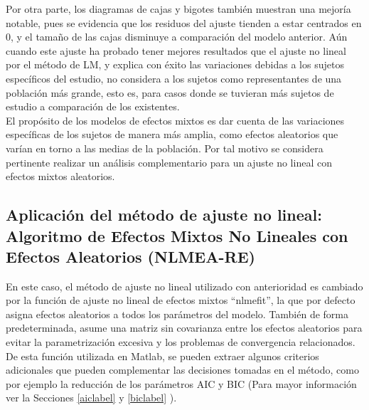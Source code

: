 Por otra parte, los diagramas de cajas y bigotes también muestran una mejoría notable, pues se evidencia que los residuos del ajuste tienden a estar centrados en 0, y el tamaño de las cajas disminuye a comparación del modelo anterior. Aún cuando este ajuste ha probado tener mejores resultados que el ajuste no lineal por el método de LM, y explica con éxito las variaciones debidas a los sujetos específicos del estudio, no considera a los sujetos como representantes de una población más grande, esto es, para casos donde se tuvieran más sujetos de estudio a comparación de los existentes.\\

El propósito de los modelos de efectos mixtos es dar cuenta de las variaciones específicas de los sujetos de manera más amplia, como efectos aleatorios que varían en torno a las medias de la población. Por tal motivo se considera pertinente realizar un análisis complementario para un ajuste no lineal con efectos mixtos aleatorios. %

\subsection{Aplicación del método de ajuste no lineal: Algoritmo de Efectos Mixtos No Lineales con Efectos Aleatorios (NLMEA-RE)}

En este caso, el método de ajuste no lineal utilizado con anterioridad es cambiado por la función de ajuste no lineal de efectos mixtos ``nlmefit'', la que por defecto  asigna efectos aleatorios a todos los parámetros del modelo. También de forma predeterminada, asume una matriz sin covarianza entre los efectos aleatorios para evitar la parametrización excesiva y los problemas de convergencia relacionados. De esta función utilizada en Matlab, se pueden extraer algunos criterios adicionales que pueden complementar las decisiones tomadas en el método, como por ejemplo la reducción de los parámetros AIC y BIC (Para mayor información ver la Secciones \ref{aiclabel} y \ref{biclabel} ).\\

